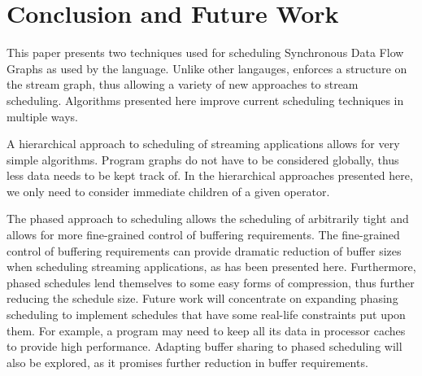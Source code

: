\section{Conclusion and Future Work}
\label{chpt:conclusion}

This paper presents two techniques used for scheduling Synchronous
Data Flow Graphs as used by the {\StreamIt} language. Unlike other
langauges, {\StreamIt} enforces a structure on the stream graph,
thus allowing a variety of new approaches to stream scheduling.
Algorithms presented here improve current scheduling techniques in
multiple ways.

A hierarchical approach to scheduling of streaming applications
allows for very simple algorithms. Program graphs do not have to
be considered globally, thus less data needs to be kept track of.
In the hierarchical approaches presented here, we only need to
consider immediate children of a given operator.

The phased approach to scheduling allows the scheduling of
arbitrarily tight {\feedbackloops} and allows for more
fine-grained control of buffering requirements. The fine-grained
control of buffering requirements can provide dramatic reduction
of buffer sizes when scheduling streaming applications, as has
been presented here. Furthermore, phased schedules lend themselves
to some easy forms of compression, thus further reducing the
schedule size. Future work will concentrate on expanding phasing
scheduling to implement schedules that have some real-life
constraints put upon them. For example, a program may need to keep
all its data in processor caches to provide high performance.
Adapting buffer sharing to phased scheduling will also be
explored, as it promises further reduction in buffer requirements.
